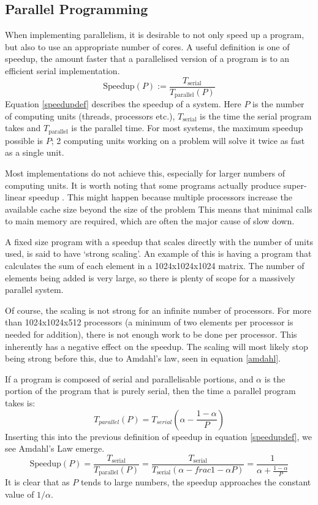 \documentclass[../main.tex]{subfiles}
\begin{document}
  \subsection{Parallel Programming}
    When implementing parallelism, it is desirable to not only speed up a program, but also to use an appropriate number of cores.
    A useful definition is one of speedup, the amount faster that a parallelised version of a program is to an efficient serial implementation.
    \begin{equation}
      \text{Speedup}(P) := \frac{T_\text{serial}}{T_\text{parallel}(P)}
      \label{speedupdef}
    \end{equation}
    Equation \ref{speedupdef} describes the speedup of a system.
    Here $P$ is the number of computing units (threads, processors etc.), $T_\text{serial}$ is the time the serial program takes and $T_\text{parallel}$ is the parallel time.
    For most systems, the maximum speedup possible is $P$; 2 computing units working on a problem will solve it twice as fast as a single unit. 

    Most implementations do not achieve this, especially for larger numbers of computing units.
    It is worth noting that some programs actually produce super-linear speedup \cite{superlinear}.
    This might happen because multiple processors increase the available cache size beyond the size of the problem
    This means that minimal calls to main memory are required, which are often the major cause of slow down.

    A fixed size program with a speedup that scales directly with the number of units used, is said to have `strong scaling'.
    An example of this is having a program that calculates the sum of each element in a 1024x1024x1024 matrix.
    The number of elements being added is very large, so there is plenty of scope for a massively parallel system.

    Of course, the scaling is not strong for an infinite number of processors.
    For more than 1024x1024x512 processors (a minimum of two elements per processor is needed for addition), there is not enough work to be done per processor.
    This inherently has a negative effect on the speedup.
    The scaling will most likely stop being strong before this, due to Amdahl's law, seen in equation \ref{amdahl}.

    If a program is composed of serial and parallelisable portions, and $\alpha$ is the portion of the program that is purely serial, then the time a parallel program takes is:
    \begin{equation}
      T_{parallel}(P) = T_{serial}\left(\alpha-\frac{1-\alpha}{P}\right)
    \end{equation}
    Inserting this into the previous definition of speedup in equation \ref{speedupdef}, we see Amdahl's Law emerge.
    \begin{equation}
      \text{Speedup}(P) = \frac{T_\text{serial}}{T_\text{parallel}(P)} = \frac{T_\text{serial}}{T_\text{serial}\left(\alpha-frac{1-\alpha}{P}\right)} = \frac{1}{\alpha+\frac{1-\alpha}{P}}
      \label{amdahl}
    \end{equation}
    It is clear that as $P$ tends to large numbers, the speedup approaches the constant value of $1/\alpha$.  
    
\end{document}
